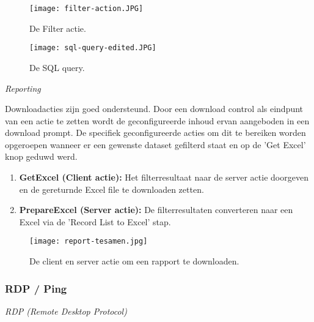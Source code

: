 \begin{figure}[h!]
    \centering
    \texttt{[image: filter-action.JPG]}
    \caption{De Filter actie.}
    \label{fig:filter-action}
\end{figure}

\begin{figure}[h!]
    \centering
    \texttt{[image: sql-query-edited.JPG]}
    \caption{De SQL query.}
    \label{fig:sql-query}
\end{figure}

\textit{Reporting}

Downloadacties zijn goed ondersteund. Door een download control als eindpunt van een actie te zetten wordt de geconfigureerde inhoud ervan aangeboden in een download prompt. De specifiek geconfigureerde acties om dit te bereiken worden opgeroepen wanneer er een gewenste dataset gefilterd staat en op de 'Get Excel' knop geduwd werd.
\begin{enumerate}
    \item \textbf{GetExcel (Client actie):} Het filterresultaat naar de server actie doorgeven en de gereturnde Excel file te downloaden zetten.
    \item \textbf{PrepareExcel (Server actie):} De filterresultaten converteren naar een Excel via de 'Record List to Excel' stap.
\end{enumerate}


\begin{figure}[h!]
    \centering
    \texttt{[image: report-tesamen.jpg]}
    \caption{De client en server actie om een rapport te downloaden.}
    \label{fig:report-tesamen}
\end{figure}

\subsubsection{RDP / Ping}

\textit{RDP (Remote Desktop Protocol)}

